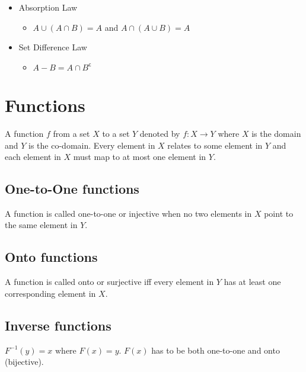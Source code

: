 \documentclass[landscape, letterpaper]{article}
\renewcommand{\complement}[1]{{#1}^\mathsf{c}}
\begin{document}
\begin{multicols}{2}
\begin{itemize}
\begin{itemize}
              \end{itemize}
        \item Absorption Law
              \begin{itemize}
                  \item $A \cup (A \cap B) = A$ and $A \cap (A \cup B) = A$
              \end{itemize}
        \item Set Difference Law
              \begin{itemize}
                  \item $A-B = A \cap \complement{B}$
              \end{itemize}
    \end{itemize}
    \section*{Functions}
    A function $f$ from a set $X$ to a set $Y$ denoted by $f: X \to Y$ where $X$ is the domain and $Y$ is the co-domain.
    Every element in $X$ relates to some element in $Y$ and each element in $X$ must map to at most one element in $Y$.
    \subsection*{One-to-One functions}
    A function is called one-to-one or injective when no two elements in $X$ point to the same element in $Y$.
    \subsection*{Onto functions}
    A function is called onto or surjective iff every element in $Y$ has at least one corresponding element in $X$.
    \subsection*{Inverse functions}
    $F^{-1}(y) = x\text{ where }F(x) = y$.
    $F(x)$ has to be both one-to-one and onto (bijective).

\end{multicols}
\end{document}
